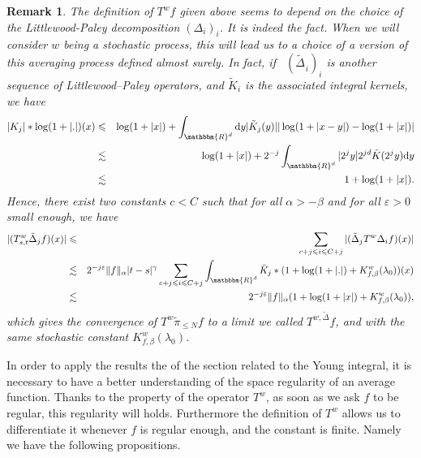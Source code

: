 \documentclass[a4paper,11pt]{article}
\newcommand{\mathd}{\mathrm{d}}
\newcommand{\nocomma}{}
\newtheorem{remark}[theorem]{Remark}
\begin{document}
\begin{remark}
  The definition of $T^{w} f$ given above seems to depend on the choice of the
  Littlewood-Paley decomposition $( \Delta_{i} )_{i}$. It is indeed the fact.
  When we will consider $w$ being a stochastic process, this will lead us to a
  choice of a version of this averaging process defined almost surely. In
  fact, if \ $( \widetilde{\Delta_{}}_{i} )_{i}$ is another sequence of
  Littlewood--Paley operators, and $\tilde{K}_{i}$ is the associated integral
  kernels, we have
  \begin{eqnarray*}
    | K_{j} | \ast \log ( 1+ | . | ) ( x ) & \leqslant & \log ( 1+ | x | ) +
    \int_{\mathbbm{R}^{d}} \mathd y  | \tilde{K}_{j} ( y ) | | \log ( 1+ | x-y
    | ) - \log ( 1+ | x | ) |\\
    & \lesssim & \log ( 1+ | x | ) +2^{-j} \int_{\mathbbm{R}^{d}} | 2^{j} y |
    2^{j d} \tilde{K} ( 2^{j} y ) \mathd y\\
    & \lesssim & 1+ \log ( 1+ | x | ).
  \end{eqnarray*}
  Hence, there exist two constants $c<C$ such that for all $\alpha >- \beta$ and for all $\varepsilon >0$ small enough,
  we have
  \begin{eqnarray*}
    | ( T^{w}_{s,t} \tilde{\Delta}_{j} f ) ( x ) | & \leqslant & \sum_{c + j \leqslant i
    \leqslant C + j} | ( \tilde{\Delta}_{j} T^{w} \Delta_{i} f ) ( x ) |\\
    & \lesssim & 2^{-j \varepsilon} \| f \|_{\alpha} | t-s |^{\gamma} \sum_{c + j \leqslant i
    \leqslant C + j} \int_{\mathbbm{R}^{d}} \tilde{K}_{j} \ast ( 1+ \log ( 1+ | . | )
    +K_{f, \beta}^{w} ( \lambda_{0} ) ) ( x )\\
    & \lesssim & 2^{-j \varepsilon} \| f \|_{\alpha} ( 1+ \log ( 1+ | x | )
    +K_{f, \beta}^{w} ( \lambda_{0} ) ),
  \end{eqnarray*}
  which gives the convergence of $T^{w} \tilde{\pi}_{\leqslant N} f$ to a
  limit we called $T^{w \nocomma , \tilde{\Delta}} f$, and with the same
  stochastic constant $K_{f, \beta}^{w} ( \lambda_{0} )$.
\end{remark}

In order to apply the results the of the section related to the Young integral, it is
necessary to have a better understanding of the space regularity of an average
function. Thanks to the property of the operator $T^{w}$, as soon as we ask
$f$ to be regular, this regularity will holds. Furthermore the definition of
$T^{w}$ allows us to differentiate it whenever $f$ is regular enough, and the
constant is finite. Namely we have the following propositions.
\end{document}
